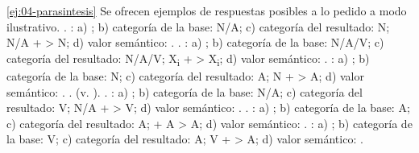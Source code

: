 \begin{solucion}{\ref{ej:04-parasintesis}}
Se ofrecen ejemplos de respuestas posibles a lo pedido a modo ilustrativo.
. : a) ; b)
categoría de la base: N/A; c) categoría del resultado: N; N/A +  >
N; d) valor semántico: .
. : a) ; b)
categoría de la base: N/A/V; c) categoría del resultado: N/A/V;
X\textsubscript{i} +  > X\textsubscript{i}; d) valor semántico:
. : a) ; b) categoría de la base: N; c) categoría del resultado: A; N +
 > A; d) valor semántico: .
.  (v. ).
. : a) ; b)
categoría de la base: N/A; c) categoría del resultado: V; N/A +  > V;
d) valor semántico: . . : a)
; b) categoría de la base: A; c) categoría del
resultado: A;  + A > A; d) valor semántico: .
: a) ; b) categoría de la base: V; c)
categoría del resultado: A; V +  > A; d) valor semántico: .
\end{solucion}

